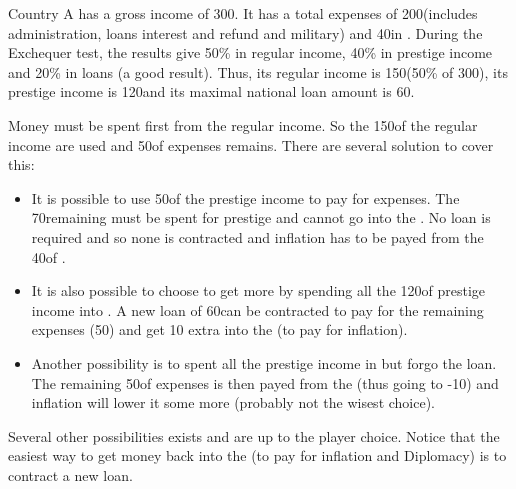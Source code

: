 \begin{exemple}
  Country A has a gross income of 300\Ducats. It has a total expenses of
  200\Ducats (includes administration, loans interest and refund and military)
  and 40\Ducats in \RT. During the Exchequer test, the results give 50\% in
  regular income, 40\% in prestige income and 20\% in loans (a good
  result). Thus, its regular income is 150\Ducats (50\% of 300), its prestige
  income is 120\Ducats and its maximal national loan amount is 60\Ducats.

  Money must be spent first from the regular income. So the 150\Ducats of the
  regular income are used and 50\Ducats of expenses remains. There are several
  solution to cover this:
  \begin{itemize}
  \item It is possible to use 50\Ducats of the prestige income to pay for
    expenses. The 70\Ducats remaining must be spent for prestige \VPs and
    cannot go into the \RT. No loan is required and so none is contracted and
    inflation has to be payed from the 40\Ducats of \RT.
  \item It is also possible to choose to get more \VPs by spending all the
    120\Ducats of prestige income into \VPs. A new loan of 60\Ducats can be
    contracted to pay for the remaining expenses (50\Ducats) and get 10 extra
    \Ducats into the \RT (to pay for inflation).
  \item Another possibility is to spent all the prestige income in \VPs but
    forgo the loan. The remaining 50\Ducats of expenses is then payed from the
    \RT (thus going to -10\Ducats) and inflation will lower it some more
    (probably not the wisest choice).
  \end{itemize}
  Several other possibilities exists and are up to the player choice. Notice
  that the easiest way to get money back into the \RT (to pay for inflation
  and Diplomacy) is to contract a new loan.
\end{exemple}

